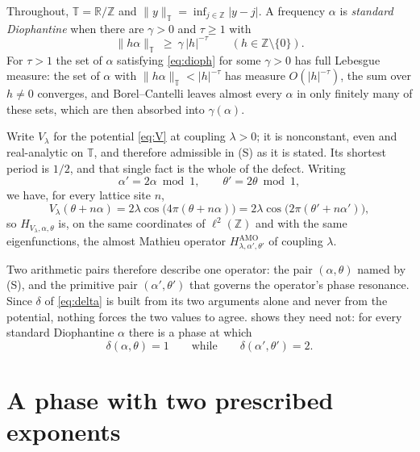 \documentclass[11pt,reqno]{amsart}
\theoremstyle{plain}
\theoremstyle{definition}
\theoremstyle{remark}
\numberwithin{equation}{section}
\begin{document}
Throughout, $\mathbb T=\mathbb R/\mathbb Z$ and
$\lVert y\rVert_{\mathbb T}=\inf_{j\in\mathbb Z}|y-j|$. A frequency
$\alpha$ is \emph{standard Diophantine} when there are $\gamma>0$ and
$\tau\ge1$ with
\begin{equation}
  \label{eq:dioph}
  \lVert h\alpha\rVert_{\mathbb T}\ \ge\ \gamma\,|h|^{-\tau}
  \qquad (h\in\mathbb Z\setminus\{0\}).
\end{equation}
For $\tau>1$ the set of $\alpha$ satisfying \eqref{eq:dioph} for some
$\gamma>0$ has full Lebesgue measure: the set of $\alpha$ with
$\lVert h\alpha\rVert_{\mathbb T}<|h|^{-\tau}$ has measure $O(|h|^{-\tau})$,
the sum over $h\ne0$ converges, and Borel--Cantelli leaves almost every
$\alpha$ in only finitely many of these sets, which are then absorbed into
$\gamma(\alpha)$.

Write $V_\lambda$ for the potential \eqref{eq:V} at coupling $\lambda>0$; it
is nonconstant, even and real-analytic on $\mathbb T$, and therefore
admissible in (S) as it is stated. Its shortest period is
$1/2$, and that single fact is the whole of the defect. Writing
\begin{equation}
  \label{eq:primitive}
  \alpha'=2\alpha \bmod 1,
  \qquad
  \theta'=2\theta \bmod 1,
\end{equation}
we have, for every lattice site $n$,
\begin{equation}
  \label{eq:same-operator}
  V_\lambda(\theta+n\alpha)
  =2\lambda\cos\bigl(4\pi(\theta+n\alpha)\bigr)
  =2\lambda\cos\bigl(2\pi(\theta'+n\alpha')\bigr),
\end{equation}
so $H_{V_\lambda,\alpha,\theta}$ is, on the same coordinates of
$\ell^2(\mathbb Z)$ and with the same eigenfunctions, the almost Mathieu
operator $H^{\mathrm{AMO}}_{\lambda,\alpha',\theta'}$ of coupling $\lambda$.

Two arithmetic pairs therefore describe one operator: the pair
$(\alpha,\theta)$ named by (S), and the primitive pair
$(\alpha',\theta')$ that governs the operator's phase resonance. Since
$\delta$ of \eqref{eq:delta} is built from its two arguments alone and never
from the potential, nothing forces the two values to agree.
 shows they need not: for every standard Diophantine
$\alpha$ there is a phase at which
\begin{equation*}
  \delta(\alpha,\theta)=1
  \qquad\text{while}\qquad
  \delta(\alpha',\theta')=2 .
\end{equation*}

\section{A phase with two prescribed exponents}
\label{sec:construction}
\end{document}
